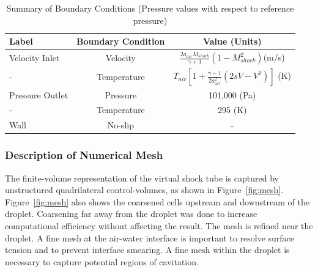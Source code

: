 \documentclass{UCF_ETD}
\begin{document}
\begin{table}
\caption{\label{tab:boundaryConditions_shockDrop} Summary of Boundary Conditions (Pressure values with respect to reference pressure)}
\centering
\begin{tabular}{lcc}
\hline
Label & Boundary Condition& Value (Units)\\\hline
Velocity Inlet & Velocity & $\frac{2a_{air}M_{shock}}{\gamma +1} \left( 1- M_{shock}^{2}\right) $(m/s) \\
-& Temperature & $ T_{air}\left[ 1 + \frac{\gamma - 1}{2 a_{air}^2} \left( 2sV - V^{2} \right)  \right]$ (K)\\
Pressure Outlet & Pressure& 101,000 (Pa)\\
-& Temperature & 295 (K) \\
Wall& No-slip& -\\
\hline
\end{tabular}
\end{table}

\subsubsection{Description of Numerical Mesh}
\label{subsubsec:mesh}
The finite-volume representation of the virtual shock tube is captured by unstructured quadrilateral control-volumes, as shown in Figure~\ref{fig:mesh}. Figure~\ref{fig:mesh} also shows the coarsened cells upstream and downstream of the droplet. Coarsening far away from the droplet was done to increase computational efficiency without affecting the result. The mesh is refined near the droplet. A fine mesh at the air-water interface is important to resolve surface tension and to prevent interface smearing. A fine mesh within the droplet is necessary to capture potential regions of cavitation.






\end{document}

